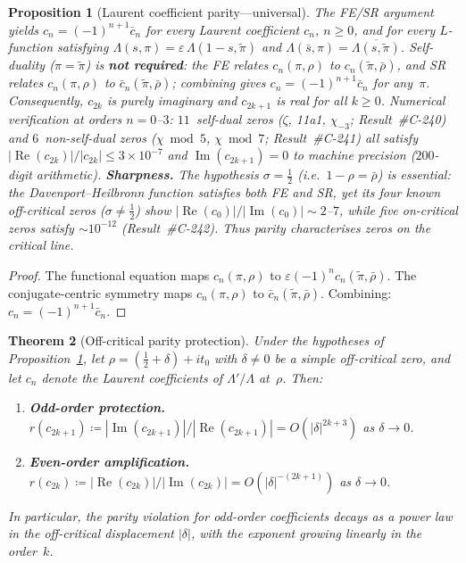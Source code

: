 \documentclass[11pt, a4paper]{article}
\theoremstyle{plain}
\newtheorem{theorem}{Theorem}
\newtheorem{proposition}[theorem]{Proposition}
\theoremstyle{definition}
\begin{document}
\begin{proposition}[Laurent coefficient parity---universal]
\label{prop:laurentparity}
The FE/SR argument yields $c_n = (-1)^{n+1}\bar{c}_n$ for
\emph{every} Laurent coefficient $c_n$, $n\geq 0$,
and for \emph{every} $L$-function satisfying
$\Lambda(s,\pi)=\varepsilon\,\Lambda(1{-}s,\tilde{\pi})$ and
$\Lambda(\bar{s},\pi)=\overline{\Lambda(s,\tilde{\pi})}$.
Self-duality ($\pi=\tilde{\pi}$) is \textbf{not required}:
the FE relates $c_n(\pi,\rho)$ to $c_n(\tilde{\pi},\bar{\rho})$,
and SR relates $c_n(\pi,\rho)$ to $\bar{c}_n(\tilde{\pi},\bar{\rho})$;
combining gives $c_n=(-1)^{n+1}\bar{c}_n$ for any~$\pi$.
Consequently, $c_{2k}$ is purely imaginary and $c_{2k+1}$ is real
for all $k\geq 0$.
Numerical verification at orders $n=0$--$3$:
$11$~self-dual zeros ($\zeta$, 11a1, $\chi_{-3}$; Result~\#C-240)
and $6$~non-self-dual zeros ($\chi\bmod 5$, $\chi\bmod 7$;
Result~\#C-241) all satisfy $|\operatorname{Re}(c_{2k})|/|c_{2k}|\leq
3\times 10^{-7}$ and $\operatorname{Im}(c_{2k+1})=0$ to machine
precision ($200$-digit arithmetic).
\textbf{Sharpness.}
The hypothesis $\sigma=\tfrac{1}{2}$ (i.e.\ $1{-}\rho=\bar{\rho}$)
is essential: the Davenport--Heilbronn function satisfies both FE and
SR, yet its four known off-critical zeros
($\sigma\neq\tfrac{1}{2}$) show
$|\!\operatorname{Re}(c_0)|/|\!\operatorname{Im}(c_0)|\sim 2$--$7$,
while five on-critical zeros satisfy $\sim 10^{-12}$
(Result~\#C-242).
Thus parity characterises zeros on the critical line.
\end{proposition}

\begin{proof}
The functional equation maps $c_n(\pi,\rho)$ to $\varepsilon(-1)^n c_n(\tilde{\pi},\bar{\rho})$.
The conjugate-centric symmetry maps $c_n(\pi,\rho)$ to $\bar{c}_n(\tilde{\pi},\bar{\rho})$.
Combining: $c_n = (-1)^{n+1}\bar{c}_n$.
\end{proof}

\begin{theorem}[Off-critical parity protection]
\label{thm:parityprotection}
Under the hypotheses of Proposition~\textup{\ref{prop:laurentparity}},
let $\rho=(\tfrac{1}{2}+\delta)+it_0$ with $\delta\neq 0$ be a simple
off-critical zero, and let $c_n$ denote the Laurent coefficients of
$\Lambda'/\Lambda$ at~$\rho$.
Then:
\begin{enumerate}[label=\upshape(\alph*)]
\item \textbf{Odd-order protection.}
      $r(c_{2k+1})\coloneqq |\!\operatorname{Im}(c_{2k+1})|/|\!\operatorname{Re}(c_{2k+1})|
       = O(|\delta|^{2k+3})$ as $\delta\to 0$.
\item \textbf{Even-order amplification.}
      $r(c_{2k})\coloneqq |\!\operatorname{Re}(c_{2k})|/|\!\operatorname{Im}(c_{2k})|
       = O(|\delta|^{-(2k+1)})$ as $\delta\to 0$.
\end{enumerate}
In particular, the parity violation for odd-order coefficients decays
as a power law in the off-critical displacement $|\delta|$,
with the exponent growing linearly in the order~$k$.
\end{theorem}
\end{document}
